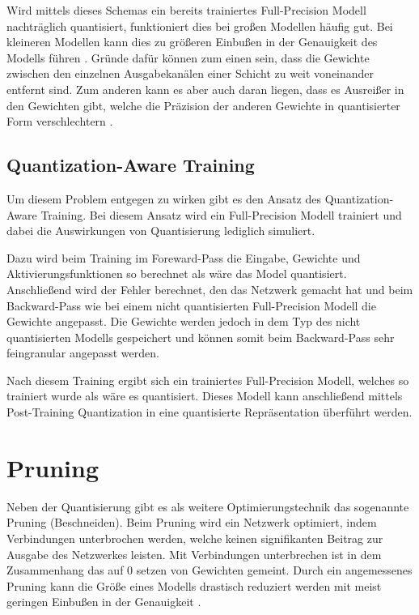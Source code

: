 Wird mittels dieses Schemas ein bereits trainiertes Full-Precision Modell nachträglich quantisiert, funktioniert dies bei großen Modellen häufig gut. Bei kleineren Modellen kann dies zu größeren Einbußen in der Genauigkeit des Modells führen \cite{jacob_quantization_2017}. Gründe dafür können zum einen sein, dass die Gewichte zwischen den einzelnen Ausgabekanälen einer Schicht zu weit voneinander entfernt sind. Zum anderen kann es aber auch daran liegen, dass es Ausreißer in den Gewichten gibt, welche die Präzision der anderen Gewichte in quantisierter Form verschlechtern \cite{jacob_quantization_2017}.


\subsection{Quantization-Aware Training}
\label{quantization_aware_training}
Um diesem Problem entgegen zu wirken gibt es den Ansatz des Quantization-Aware Training. Bei diesem Ansatz wird ein Full-Precision Modell trainiert und dabei die Auswirkungen von Quantisierung lediglich simuliert.

Dazu wird beim Training im Foreward-Pass die Eingabe, Gewichte und Aktivierungsfunktionen so berechnet als wäre das Model quantisiert. Anschließend wird der Fehler berechnet, den das Netzwerk gemacht hat und beim Backward-Pass wie bei einem nicht quantisierten Full-Precision Modell die Gewichte angepasst. Die Gewichte werden jedoch in dem Typ des nicht quantisierten Modells gespeichert und können somit beim Backward-Pass sehr feingranular angepasst werden.

Nach diesem Training ergibt sich ein trainiertes Full-Precision Modell, welches so trainiert wurde als wäre es quantisiert. Dieses Modell kann anschließend mittels Post-Training Quantization in eine quantisierte Repräsentation überführt werden.



\section{Pruning}
\label{pruning}
Neben der Quantisierung gibt es als weitere Optimierungstechnik das sogenannte Pruning (Beschneiden). Beim Pruning wird ein Netzwerk optimiert, indem Verbindungen unterbrochen werden, welche keinen signifikanten Beitrag zur Ausgabe des Netzwerkes leisten. Mit Verbindungen unterbrechen ist in dem Zusammenhang das auf 0 setzen von Gewichten gemeint. Durch ein angemessenes Pruning kann die Größe eines Modells drastisch reduziert werden mit meist geringen Einbußen in der Genauigkeit \cite{zhu_prune_2017}.


